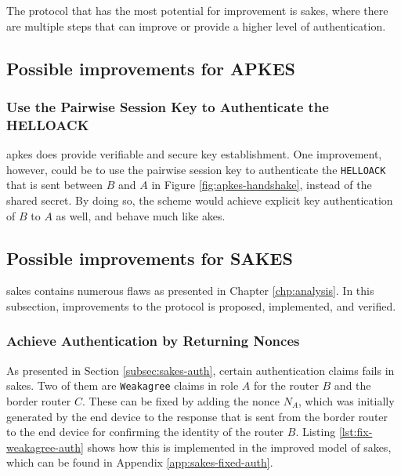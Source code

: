 The protocol that has the most potential for improvement is \gls{sakes}, where there are multiple steps that can improve or provide a higher level of authentication.

\subsection{Possible improvements for APKES}

\subsubsection{Use the Pairwise Session Key to Authenticate the HELLOACK}

\gls{apkes} does provide verifiable and secure key establishment. One improvement, however, could be to use the pairwise session key to authenticate the \texttt{HELLOACK} that is sent between $B$ and $A$ in Figure \ref{fig:apkes-handshake}, instead of the shared secret. By doing so, the scheme would achieve explicit key authentication of $B$ to $A$ as well, and behave much like \gls{akes}.



\subsection{Possible improvements for SAKES}
\label{subsec:sakes-fix}
\gls{sakes} contains numerous flaws as presented in Chapter \ref{chp:analysis}. In this subsection, improvements to the protocol is proposed, implemented, and verified.

\subsubsection{Achieve Authentication by Returning Nonces}


As presented in Section \ref{subsec:sakes-auth}, certain authentication claims fails in \gls{sakes}. Two of them are \texttt{Weakagree} claims in role $A$ for the router $B$ and the border router $C$. These can be fixed by adding the nonce $N_A$, which was initially generated by the end device to the response that is sent from the border router to the end device for confirming the identity of the router $B$. Listing \ref{lst:fix-weakagree-auth} shows how this is implemented in the improved model of \gls{sakes}, which can be found in Appendix \ref{app:sakes-fixed-auth}.\\

